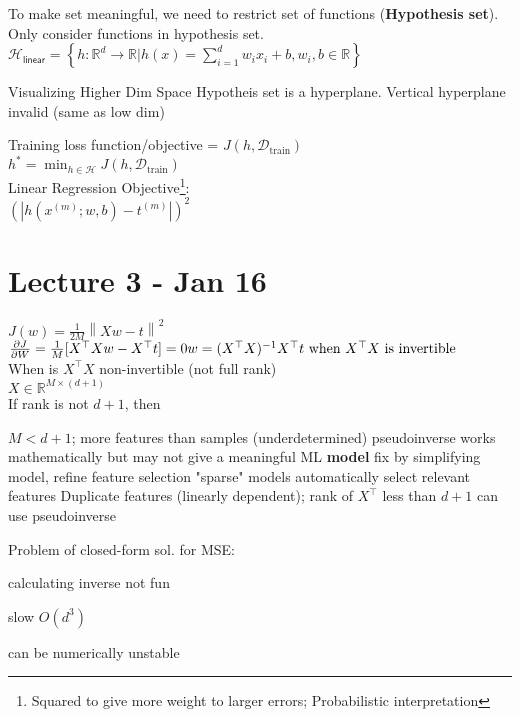 \documentclass{article}
\begin{document}
To make set meaningful, we need to restrict set of functions (\textbf{Hypothesis set}).
Only consider functions in hypothesis set. \\[5pt]
$\mathcal H _{\textsf{linear}} = \left \{ h : \mathbb R ^d \to \mathbb R | h(x) = \sum_{i=1}^{d}w_i x_i + b, w_i,b \in \mathbb R \right \}
$

\begin{expln}
  {Visualizing Higher Dim Space}{}
  Hypotheis set is a hyperplane. Vertical hyperplane invalid (same as low dim)
\end{expln}

Training loss function/objective = 
$J(h, \mathcal D_{\text{train}})$
\\
$h^* = \min_{h \in \mathcal H} J(h, \mathcal D_{\text{train}})
$
\\
Linear Regression Objective\footnote[1]{Squared to give more weight to larger errors; Probabilistic interpretation}: \\
$(|h(x^{(m)}; w, b ) - t^{(m)}|)^2$


\section{Lecture 3 - Jan 16}
$J(w) = \frac{1}{2M} \left \| Xw-t \right \|^2$\\[5pt]
\begin{math}
  \frac{\partial J}{\partial W} = \frac{1}{M} [X^\top X w - X^\top t] =0
  \\[5pt]
  w = (X^\top X)^{-1} X^\top t \text{ when $X^\top X$ is invertible}
\end{math}
\\[5pt]
When is $X^\top X$ non-invertible (not full rank)
\\[5pt]
$X\in \mathbb R ^{M\times (d+1)}$\\[5pt]
If rank is not $d+1$, then
\begin{outline}
  \1 $M < d+1$; more features than samples (underdetermined)
    \2 pseudoinverse works mathematically but may not give a meaningful ML \textbf{model}
    \2 fix by simplifying model, refine feature selection
    \2 "sparse" models automatically select relevant features 
  \1 Duplicate features (linearly dependent); rank of $X^\top$ 
  less than $d+1$
    \2 can use pseudoinverse
\end{outline}
\noindent
Problem of closed-form sol. for MSE:
  \begin{list}{}{}
    \item calculating inverse not fun
    \item slow $O(d^3)$
    \item can be numerically unstable 
  \end{list}
\end{document}
